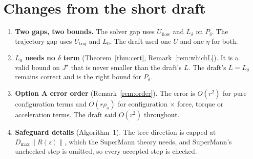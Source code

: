 \documentclass[11pt]{article}
\newcommand{\Pd}{P_\delta}
\newcommand{\Uflow}{U_{\mathrm{flow}}}
\newcommand{\Utraj}{U_{\mathrm{traj}}}
\theoremstyle{plain}
\theoremstyle{definition}
\theoremstyle{remark}
\begin{document}
\section*{Changes from the short draft}
\begin{enumerate}[leftmargin=1.6em,itemsep=1pt]
  \item \textbf{Two gaps, two bounds.} The solver gap uses $\Uflow$ and $L_\delta$ on $\Pd$. The trajectory gap uses $\Utraj$ and $L_0$. The draft used one $U$ and one $\eta$ for both.
  \item \textbf{$L_0$ needs no $\delta$ term} (Theorem~\ref{thm:cert}, Remark~\ref{rem:whichL}). It is a valid bound on $J^\star$ that is never smaller than the draft's $L$. The draft's $L=L_\delta$ remains correct and is the right bound for $\Pd$.
  \item \textbf{Option A error order} (Remark~\ref{rem:order}). The error is $O(r^2)$ for pure configuration terms and $O(r\rho_a)$ for configuration $\times$ force, torque or acceleration terms. The draft said $O(r^2)$ throughout.
  \item \textbf{Safeguard details} (Algorithm~1). The tree direction is capped at $D_{\max}\|R(z)\|$, which the SuperMann theory needs, and SuperMann's unchecked step is omitted, so every accepted step is checked.
\end{enumerate}

\end{document}
